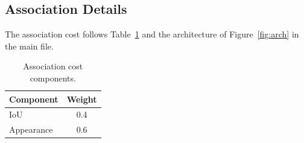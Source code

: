 \subsection{Association Details}
\label{sec:association}

The association cost follows Table~\ref{tab:assoc-cost} and the
architecture of Figure~\ref{fig:arch} in the main file.

\begin{table}[h]
  \centering
  \label{tab:assoc-cost}
  \caption{Association cost components.}
  \begin{tabular}{lc}
    \hline
    Component & Weight \\
    \hline
    IoU & 0.4 \\
    Appearance & 0.6 \\
    \hline
  \end{tabular}
\end{table}
